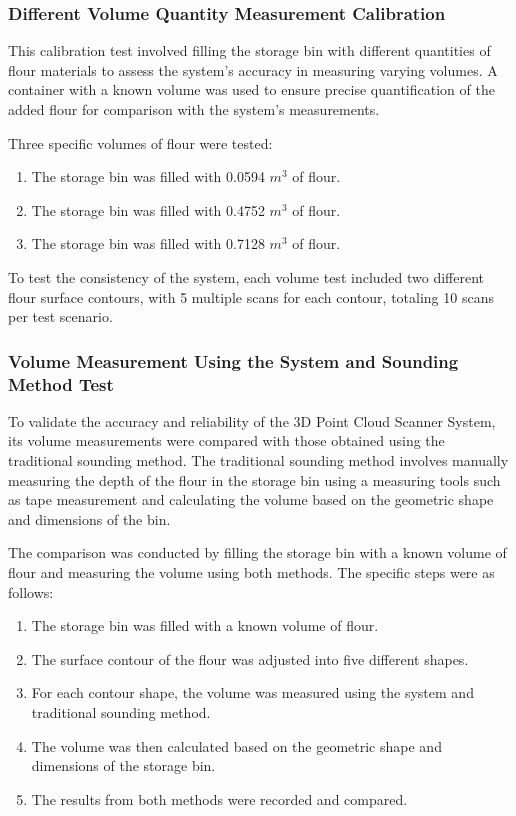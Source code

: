 
\subsubsection{Different Volume Quantity Measurement Calibration}
\label{ch3:subsubsec:different-volume-measurement-test}

This calibration test involved filling the storage bin with different quantities of flour materials to assess the system's accuracy in measuring varying volumes. A container with a known volume was used to ensure precise quantification of the added flour for comparison with the system's measurements.

Three specific volumes of flour were tested:
\begin{enumerate}
	\item The storage bin was filled with 0.0594 $m^3$ of flour.
	\item The storage bin was filled with 0.4752 $m^3$ of flour.
	\item The storage bin was filled with 0.7128 $m^3$ of flour.
\end{enumerate}

To test the consistency of the system, each volume test included two different flour surface contours, with 5 multiple scans for each contour, totaling 10 scans per test scenario.

\subsubsection{Volume Measurement Using the System and Sounding Method Test}
To validate the accuracy and reliability of the 3D Point Cloud Scanner System, its volume measurements were compared with those obtained using the traditional sounding method. The traditional sounding method involves manually measuring the depth of the flour in the storage bin using a measuring tools such as tape measurement and calculating the volume based on the geometric shape and dimensions of the bin.

The comparison was conducted by filling the storage bin with a known volume of flour and measuring the volume using both methods. The specific steps were as follows:
\begin{enumerate}
	\item The storage bin was filled with a known volume of flour.
	\item The surface contour of the flour was adjusted into five different shapes.
	\item For each contour shape, the volume was measured using the system and traditional sounding method.
	\item The volume was then calculated based on the geometric shape and dimensions of the storage bin.
	\item The results from both methods were recorded and compared.
\end{enumerate}

